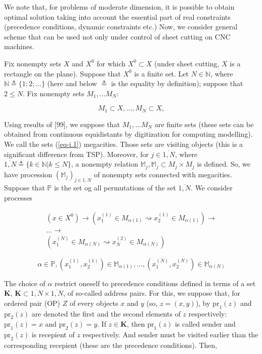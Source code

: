 \documentclass{article}
\begin{document}
We note that,
for problems of moderate dimension,
it is possible to obtain optimal solution taking into account
the essential part of real constraints
(precedence conditions,
dynamic constraints etc.)
Now,
we consider general scheme that can be used not only
under control of sheet cutting on CNC machines.

Fix nonempty sets
$X$ and $X^0$
for which
$X^0 \subset X$
(under sheet cutting,
$X$ is a rectangle on the plane).
Suppose that
$X^0$ is a finite set.
Let
$N \in \mathbb N$,
where
$\mathbb N \triangleq \{1; 2; \dots \}$
(here and below
$\triangleq$
is the equality by definition);
suppose that
$2 \leqslant N$.
Fix nonempty sets
$M_1, \dots M_N$:

\begin{equation}
  \label{eq-i.1}
  M_1 \subset X,
  \dots ,
  M_N \subset X,
\end{equation}

Using results of
[99],  %
we suppose that
$M_1, \dots M_N$
are finite sets
(these sets can be obtained from
continuous equidistants by digitization
for computing modelling).
We call the sets
(\ref{eq-i.1})
megacities.
Those sets are visiting objects
(this is a significant difference from TSP).
Moreover,
for
$j \in \overline{1, N}$,
where
$\overline{1,N} \triangleq \{k \in \mathbb N|k \leqslant N\}$,
a nonempty relation
$\mathbb M_j,
\mathbb M_j \subset M_j \times M_j$
is defined.
So, we have procession
$(\mathbb M_j)_{j \in \overline{1,N}}$
of nonempty sets connected with megacities.
Suppose that
$\mathbb P$
is the set og all permutations of the set
$\overline{1,N}$.
We consider processes

\begin{align*}
  (x\in X^0) \to
  (x_1^{(1)} \in M_{\alpha(1)} \rightsquigarrow x_2^{(1)} \in M_{\alpha(1)}) \to \\
  \dots \to \\
  (x_1^{(N)} \in M_{\alpha(N)} \rightsquigarrow x_N^{(2)} \in M_{\alpha(N)})
\end{align*}

\begin{equation}
  \label{eq-i.2}
  \alpha \in \mathbb P,
  (x_1^{(1)}, x_2^{(1)}) \in \mathbb M_{\alpha(1)},
  \dots ,
  (x_1^{(N)}, x_2^{(N)}) \in \mathbb M_{\alpha(N)}
\end{equation}

The choice of
$\alpha$
restrict oneself to precedence conditions defined in terms of a set
$\mathbf K$,
$\mathbf K \subset \overline{1,N} \times \overline{1,N}$,
of so-called address pairs.
For this,
we suppose that,
for ordered pair (OP)
$Z$
of every objects
$x$ and $y$
(so,
$z=(x,y)$),
by
$\mathrm{pr}_1(z)$
and
$\mathrm{pr}_2(z)$
are denoted the first and the second elements of
$z$
respectively:
$\mathrm{pr}_1(z)=x$
and
$\mathrm{pr}_2(z)=y$.
If
$z \in \mathbf K$,
then
$\mathrm{pr}_1(z)$
is called sender
and
$\mathrm{pr}_2(z)$
is recepient of
$z$
respectively.
And sender must be visited earlier than
the corresponding recepient
(these are the precedence conditions).
Then,
\end{document}
